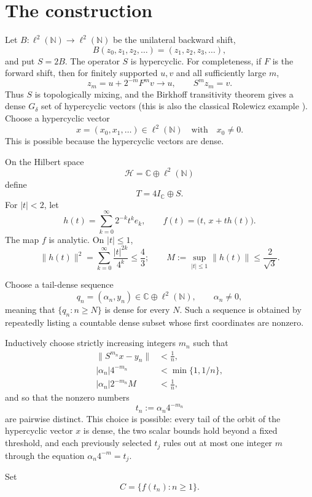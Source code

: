 \documentclass[11pt]{article}
\newcommand{\C}{\mathbb C}
\newcommand{\N}{\mathbb N}
\begin{document}
\section*{The construction}
Let $B:\ell^2(\N)\to\ell^2(\N)$ be the unilateral backward shift,
\[
 B(z_0,z_1,z_2,\ldots)=(z_1,z_2,z_3,\ldots),
\]
and put $S=2B$.  The operator $S$ is hypercyclic.  For completeness, if $F$ is the forward shift, then for finitely supported $u,v$ and all sufficiently large $m$,
\[
 z_m=u+2^{-m}F^m v\longrightarrow u,
 \qquad S^m z_m=v.
\]
Thus $S$ is topologically mixing, and the Birkhoff transitivity theorem gives a dense $G_\delta$ set of hypercyclic vectors (this is also the classical Rolewicz example \cite{Rolewicz,GEP}).  Choose a hypercyclic vector
\[
 x=(x_0,x_1,\ldots)\in\ell^2(\N)
 \quad\text{with}\quad x_0\neq0.
\]
This is possible because the hypercyclic vectors are dense.

On the Hilbert space
\[
 \mathcal H=\C\oplus\ell^2(\N)
\]
define
\[
 T=4I_{\C}\oplus S.
\]
For $|t|<2$, let
\[
 h(t)=\sum_{k=0}^{\infty}2^{-k}t^k e_k,
 \qquad
 f(t)=\bigl(t,\,x+t h(t)\bigr).
\]
The map $f$ is analytic.  On $|t|\leq1$,
\begin{equation}\label{eq:M}
 \|h(t)\|^2=\sum_{k=0}^{\infty}\frac{|t|^{2k}}{4^k}
 \leq\frac43;
 \qquad M:=\sup_{|t|\leq1}\|h(t)\|\leq\frac2{\sqrt3}.
\end{equation}

Choose a tail-dense sequence
\[
 q_n=(\alpha_n,y_n)\in\C\oplus\ell^2(\N),
 \qquad \alpha_n\neq0,
\]
meaning that $\{q_n:n\geq N\}$ is dense for every $N$.  Such a sequence is obtained by repeatedly listing a countable dense subset whose first coordinates are nonzero.

Inductively choose strictly increasing integers $m_n$ such that
\begin{align}
 \|S^{m_n}x-y_n\|&<\frac1n,\label{eq:visit}\\
 |\alpha_n|4^{-m_n}&<\min\{1,1/n\},\label{eq:smallt}\\
 |\alpha_n|2^{-m_n}M&<\frac1n,\label{eq:error}
\end{align}
and so that the nonzero numbers
\[
 t_n:=\alpha_n4^{-m_n}
\]
are pairwise distinct.  This choice is possible: every tail of the orbit of the hypercyclic vector $x$ is dense, the two scalar bounds hold beyond a fixed threshold, and each previously selected $t_j$ rules out at most one integer $m$ through the equation $\alpha_n4^{-m}=t_j$.

Set
\[
 C=\{f(t_n):n\geq1\}.
\]
\end{document}

